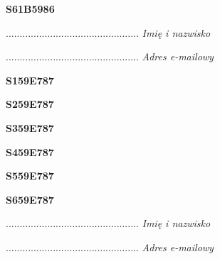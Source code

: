 \begin{turn}{90}\huge \textbf{S61B5986}\end{turn}

\begin{turn}{90}\begin{minipage}{\linewidth} \vspace{20mm} ................................................  \textit{Imię i nazwisko}\end{minipage}\end{turn}

\begin{turn}{90}\begin{minipage}{\linewidth} \vspace{20mm} ................................................  \textit{Adres e-mailowy}\end{minipage}\end{turn}

\begin{turn}{90}\huge \textbf{S159E787}\end{turn}

\begin{turn}{90}\huge \textbf{S259E787}\end{turn}

\begin{turn}{90}\huge \textbf{S359E787}\end{turn}

\begin{turn}{90}\huge \textbf{S459E787}\end{turn}

\begin{turn}{90}\huge \textbf{S559E787}\end{turn}

\begin{turn}{90}\huge \textbf{S659E787}\end{turn}

\begin{turn}{90}\begin{minipage}{\linewidth} \vspace{20mm} ................................................  \textit{Imię i nazwisko}\end{minipage}\end{turn}

\begin{turn}{90}\begin{minipage}{\linewidth} \vspace{20mm} ................................................  \textit{Adres e-mailowy}\end{minipage}\end{turn}

